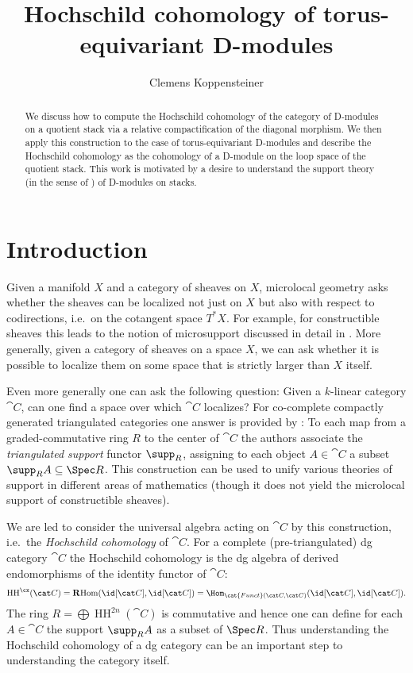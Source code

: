 \documentclass[english]{ck-article}
\title{Hochschild cohomology of torus-equivariant D-modules}
\author{Clemens Koppensteiner}
\newcommand{\HCoh}{\operatorname{HH}^\cx}
\begin{document}
\maketitle


\begin{abstract}
    We discuss how to compute the Hochschild cohomology of the category of D-modules on a quotient stack via a relative compactification of the diagonal morphism.
    We then apply this construction to the case of torus-equivariant D-modules and describe the Hochschild cohomology as the cohomology of a D-module on the loop space of the quotient stack.
    This work is motivated by a desire to understand the support theory (in the sense of \cite{BensonIyengarKrause:2008:LocalCohomologyAndSupportForTriangulatedCategories}) of D-modules on stacks.
\end{abstract}

\setcounter{tocdepth}{1}
\tableofcontents

\section{Introduction}

Given a manifold $X$ and a category of sheaves on $X$, microlocal geometry asks whether the sheaves can be localized not just on $X$ but also with respect to codirections, i.e.~on the cotangent space $T^*X$.
For example, for constructible sheaves this leads to the notion of microsupport discussed in detail in \cite{KashiwaraSchapira:1994:SheavesOnManifolds}.
More generally, given a category of sheaves on a space $X$, we can ask whether it is possible to localize them on some space that is strictly larger than $X$ itself.

Even more generally one can ask the following question: Given a $k$-linear category $\cat C$, can one find a space over which $\cat C$ localizes?
For co-complete compactly generated triangulated categories one answer is provided by \cite{BensonIyengarKrause:2008:LocalCohomologyAndSupportForTriangulatedCategories}:
To each map from a graded-commutative ring $R$ to the center of $\cat C$ the authors associate the \emph{triangulated support} functor $\supp_R$, assigning to each object $A ∈ \cat C$ a subset $\supp_R A \subseteq \Spec R$.
This construction can be used to unify various theories of support in different areas of mathematics (though it does not yield the microlocal support of constructible sheaves).

We are led to consider the universal algebra acting on $\cat C$ by this construction, i.e.~the \emph{Hochschild cohomology} of $\cat C$.
For a complete (pre-triangulated) dg category $\cat C$ the Hochschild cohomology is the dg algebra of derived endomorphisms of the identity functor of $\cat C$:
\[
    \HCoh(\cat C)
    = \operatorname{\mathbf{R}Hom}(\id[\cat C], \id[\cat C])
    = \Hom_{\cat{Funct}(\cat C, \cat C)}(\id[\cat C], \id[\cat C]).
\]
The ring $R = \bigoplus \operatorname{HH}^{2n}(\cat C)$ is commutative and hence one can define for each $A ∈ \cat C$ the support $\supp_R A$ as a subset of $\Spec R$.
Thus understanding the Hochschild cohomology of a dg category can be an important step to understanding the category itself.
\end{document}
